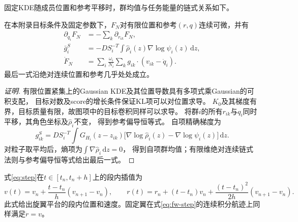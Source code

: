 \documentclass[UTF8,a4paper,11pt,fontset=none]{ctexart}
\begin{document}
固定KDE随成员位置和参考平移时，群均值与任务能量的链式关系如下。
\begin{lemma}[固定目标与KDE的参考平移]\label{lem:kde-chain}
在本附录目标条件及固定参数下，$F_N$对有限位置和参考$(r,q)$连续可微，并有
\begin{align*}
\partial_{q_i}F_N&=-\sum_k\partial_{r_{ik}}F_N,\\
\bar g_i^S&=-D S_i^{-T}\int\widehat\rho_i(z)\nabla\log\psi_i(z)\,\mathrm dz,\\
\dot F_N&=\sum_i\frac{\omega_i}{N_i}\sum_k g_{ik}\cdot(v_{ik}-\dot q_i).
\end{align*}
最后一式沿绝对连续位置和参考几乎处处成立。
\end{lemma}
\begin{proof}[证明]
有限位置紧集上的Gaussian KDE及其位置导数具有多项式乘Gaussian的可积支配，
目标对数及score的增长条件保证KL项可以对位置求导。
$K_0$及其梯度有界，目标质量有限，故图项中的目标卷积同样可以求导。
将群$i$的所有$r_{ik}$与$q_i$同时平移，其角色坐标及$\widehat\rho_i$不变，
得到参考偏导恒等式。
自项精确梯度为
\[
g^S_{ik}=D S_i^{-T}\int G_{H_i}(z-z_{ik})
\big[\nabla\log\widehat\rho_i(z)-\nabla\log\psi_i(z)\big]\,\mathrm dz.
\]
对粒子取平均后，熵项为$\int\nabla\widehat\rho_i\,\mathrm dz=0$，
得到自项群均值；有限维绝对连续链式法则与参考偏导恒等式给出最后一式。
\end{proof}
式\eqref{eq:step}在$t\in[t_n,t_n+h]$上的段内插值为
\[
v(t)=v_n+\frac{t-t_n}{h}(v_{n+1}-v_n),\qquad
r(t)=r_n+(t-t_n)v_n+\frac{(t-t_n)^2}{2h}(v_{n+1}-v_n).
\]
此式给出旋翼平台的段内位置和速度。固定翼在式\eqref{eq:fw-step}的连续积分航迹上同样满足$\dot r=v$。
\end{document}
